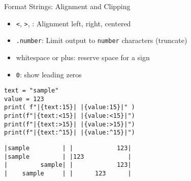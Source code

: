\begin{frame}[fragile]{Format Strings: Alignment and Clipping}
%
\begin{itemize}
\item \texttt{<}, \texttt{>}, \inPy{^}: Alignment left, right, centered
\item \texttt{.number}: Limit output to \texttt{number} characters (truncate)
\item whitespace or plus: reserve space for a sign
\item \texttt{0}: show leading zeros
\end{itemize}

\vspace{6pt}
\begin{codebox}[Code: Format Strings (3), width=.49\linewidth, nobeforeafter, equal height group = grpFormatString3]
\begin{verbatim}
text = "sample"
value = 123
print( f"|{text:15}| |{value:15}|" )
print(f"|{text:<15}| |{value:<15}|")
print(f"|{text:>15}| |{value:>15}|")
print(f"|{text:^15}| |{value:^15}|")
\end{verbatim}
\end{codebox}
%
\begin{cmdbox}[Output: Format Strings (3), width=.49\linewidth, nobeforeafter, equal height group = grpFormatString3]
\begin{verbatim}
|sample         | |            123|
|sample         | |123            |
|         sample| |            123|
|    sample     | |      123      |
\end{verbatim}
\end{cmdbox}
%
\end{frame}



